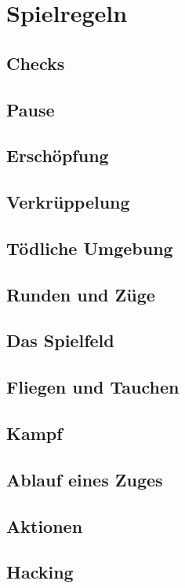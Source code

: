 \chapter{Spielregeln}
\section{Checks}
\section{Pause}
\section{Erschöpfung}
\section{Verkrüppelung}
\section{Tödliche Umgebung}
\section{Runden und Züge}
\section{Das Spielfeld}
\section{Fliegen und Tauchen}
\section{Kampf}
\section{Ablauf eines Zuges}
\section{Aktionen}
\section{Hacking}
